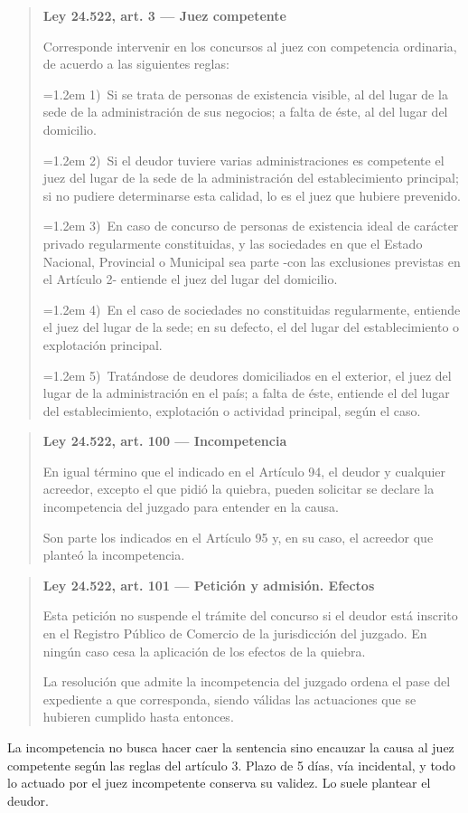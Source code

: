 \documentclass[12pt,oneside]{book}
\newenvironment{articulo}[1]
  {\begin{quote}\small\textbf{#1}\par\smallskip}
  {\end{quote}}
\newcommand{\inciso}[2]{\par\noindent\hangindent=1.2em\hangafter=1 #1)~#2}
\begin{document}
\begin{articulo}{Ley 24.522, art. 3 --- Juez competente}
Corresponde intervenir en los concursos al juez con competencia ordinaria, de acuerdo a las siguientes reglas:
\inciso{1}{Si se trata de personas de existencia visible, al del lugar de la sede de la administración de sus negocios; a falta de éste, al del lugar del domicilio.}
\inciso{2}{Si el deudor tuviere varias administraciones es competente el juez del lugar de la sede de la administración del establecimiento principal; si no pudiere determinarse esta calidad, lo es el juez que hubiere prevenido.}
\inciso{3}{En caso de concurso de personas de existencia ideal de carácter privado regularmente constituidas, y las sociedades en que el Estado Nacional, Provincial o Municipal sea parte -con las exclusiones previstas en el Artículo 2- entiende el juez del lugar del domicilio.}
\inciso{4}{En el caso de sociedades no constituidas regularmente, entiende el juez del lugar de la sede; en su defecto, el del lugar del establecimiento o explotación principal.}
\inciso{5}{Tratándose de deudores domiciliados en el exterior, el juez del lugar de la administración en el país; a falta de éste, entiende el del lugar del establecimiento, explotación o actividad principal, según el caso.}
\end{articulo}

\begin{articulo}{Ley 24.522, art. 100 --- Incompetencia}
En igual término que el indicado en el Artículo 94, el deudor y cualquier acreedor, excepto el que pidió la quiebra, pueden solicitar se declare la incompetencia del juzgado para entender en la causa.

Son parte los indicados en el Artículo 95 y, en su caso, el acreedor que planteó la incompetencia.
\end{articulo}

\begin{articulo}{Ley 24.522, art. 101 --- Petición y admisión. Efectos}
Esta petición no suspende el trámite del concurso si el deudor está inscrito en el Registro Público de Comercio de la jurisdicción del juzgado. En ningún caso cesa la aplicación de los efectos de la quiebra.

La resolución que admite la incompetencia del juzgado ordena el pase del expediente a que corresponda, siendo válidas las actuaciones que se hubieren cumplido hasta entonces.
\end{articulo}

\begin{important}
La incompetencia no busca hacer caer la sentencia sino encauzar la causa al juez competente según las reglas del artículo 3. Plazo de 5 días, vía incidental, y todo lo actuado por el juez incompetente conserva su validez. Lo suele plantear el deudor.
\end{important}
\end{document}
